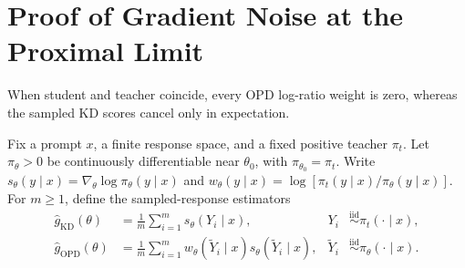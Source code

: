 \section{Proof of Gradient Noise at the Proximal Limit}
\label{app:proximal-gradient-noise}

\begin{insight}
When student and teacher coincide, every OPD log-ratio weight is zero,
whereas the sampled KD scores cancel only in expectation.
\end{insight}

Fix a prompt $x$, a finite response space, and a fixed positive teacher
$\pi_t$. Let $\pi_\theta>0$ be continuously differentiable near
$\theta_0$, with $\pi_{\theta_0}=\pi_t$.
Write $s_\theta(y\mid x)=\nabla_\theta\log\pi_\theta(y\mid x)$ and
$w_\theta(y\mid x)=\log[\pi_t(y\mid x)/\pi_\theta(y\mid x)]$.
For $m\ge1$, define the sampled-response estimators
\begin{align}
 \widehat g_{\mathrm{KD}}(\theta)
 &=\frac1m\sum_{i=1}^m s_\theta(Y_i\mid x),
 &Y_i&\overset{\mathrm{iid}}{\sim}\pi_t(\cdot\mid x),
 \label{eq:proximal-kd-estimator}\\
 \widehat g_{\mathrm{OPD}}(\theta)
 &=\frac1m\sum_{i=1}^m w_\theta(\widetilde Y_i\mid x)
                          s_\theta(\widetilde Y_i\mid x),
 &\widetilde Y_i&\overset{\mathrm{iid}}{\sim}\pi_\theta(\cdot\mid x).
 \label{eq:proximal-opd-estimator}
\end{align}

